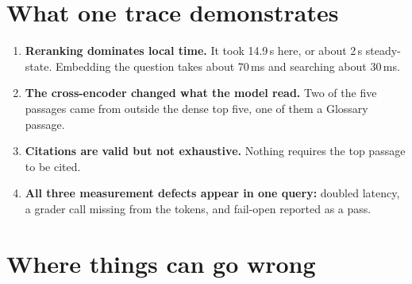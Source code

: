 \section{What one trace demonstrates}

\begin{enumerate}
  \item \textbf{Reranking dominates local time.} It took 14.9\,s here, or about 2\,s steady-state. Embedding the question takes about 70\,ms and searching about 30\,ms.
  \item \textbf{The cross-encoder changed what the model read.} Two of the five passages came from outside the dense top five, one of them a Glossary passage.
  \item \textbf{Citations are valid but not exhaustive.} Nothing requires the top passage to be cited.
  \item \textbf{All three measurement defects appear in one query:} doubled latency, a grader call missing from the tokens, and fail-open reported as a pass.
\end{enumerate}

\section{Where things can go wrong}
\label{sec:failure-flows}

